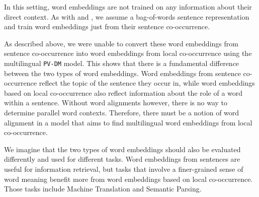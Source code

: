In this setting, word embeddings are not trained on any information about their direct context. 
As with \cite{hermann2013multilingual} and \cite{SarathChandar2014autoencoder}, we assume a bag-of-words sentence representation and train word embeddings just from their sentence co-occurrence.

As described above, we were unable to convert these word embeddings from sentence co-occurrence into word embeddings from local co-occurrence using the multilingual \texttt{PV-DM} model.
This shows that there is a fundamental difference between the two types of word embeddings.
Word embeddings from sentence co-occurrence reflect the topic of the sentence they occur in, while word embeddings based on local co-occurrence also reflect information about the role of a word within a sentence.
Without word alignments however, there is no way to determine parallel word contexts.
Therefore, there must be a notion of word alignment in a model that aims to find multilingual word embeddings from local co-occurrence.

We imagine that the two types of word embeddings should also be evaluated differently and used for different tasks.
Word embeddings from sentences are useful for information retrieval, but tasks that involve a finer-grained sense of word meaning benefit more from word embeddings based on local co-occurrence.
Those tasks include Machine Translation and Semantic Parsing.